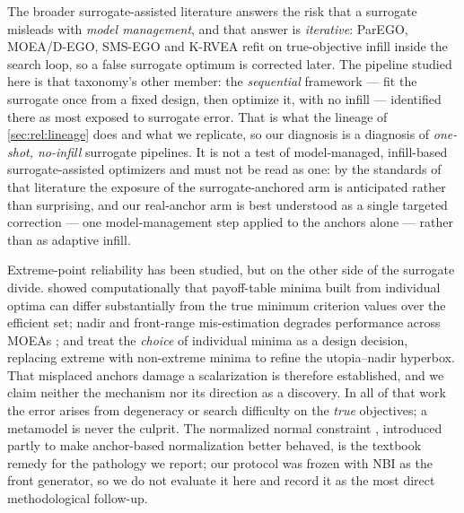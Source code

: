 The broader surrogate-assisted literature \citep{jin2011surrogate,tabatabaei2015survey,chugh2019survey,deb2019taxonomy}
answers the risk that a surrogate misleads with \emph{model management}, and that answer is \emph{iterative}: ParEGO,
MOEA/D-EGO, SMS-EGO and K-RVEA \citep{knowles2006parego,zhang2010moeadego,ponweiser2008smsego,chugh2018krvea} refit on
true-objective infill inside the search loop, so a false surrogate optimum is corrected later. The pipeline studied
here is that taxonomy's other member: the \emph{sequential} framework \citep{tabatabaei2015survey} --- fit the
surrogate once from a fixed design, then optimize it, with no infill --- identified there as most exposed to surrogate
error. That is what the lineage of
\cref{sec:rel:lineage} does and what we replicate, so our diagnosis is a diagnosis of \emph{one-shot, no-infill}
surrogate pipelines. It is not a test of model-managed, infill-based surrogate-assisted
optimizers and must not be read as one: by the standards of that literature the exposure of the surrogate-anchored arm
is anticipated rather than surprising, and our real-anchor arm is best understood as a single targeted correction ---
one model-management step applied to the anchors alone --- rather than as adaptive infill.

Extreme-point reliability has been studied, but on the other side of the surrogate divide.
\citet{isermann1988payoff} showed computationally that payoff-table minima built from individual optima can differ
substantially from the true minimum criterion values over the efficient set; nadir and front-range mis-estimation
degrades performance across MOEAs \citep{deb2010nadir,he2021normalization}; and \citet{herrmann2026nonextreme} treat
the \emph{choice} of individual minima as a design decision, replacing extreme with non-extreme minima to refine the
utopia--nadir hyperbox.
That misplaced anchors damage a scalarization is therefore established, and we claim neither
the mechanism nor its direction as a discovery. In all of that work the error arises from degeneracy or search
difficulty on the \emph{true} objectives; a metamodel is never the culprit. The normalized normal constraint
\citep{messac2003normalized}, introduced partly to make anchor-based normalization better behaved, is the
textbook remedy for the pathology we report; our protocol was frozen with NBI as the front generator, so we do not
evaluate it here and record it as the most direct methodological follow-up.

